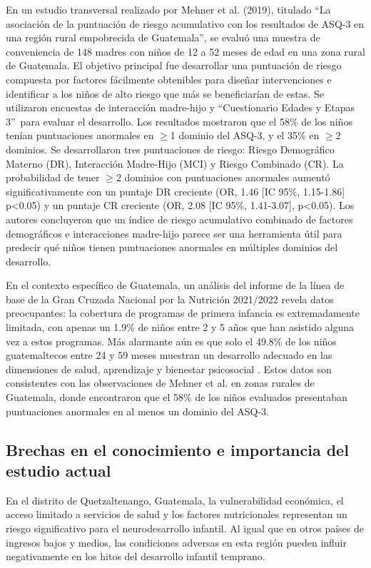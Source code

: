 \documentclass[11pt,letterpaper]{report}
\newcommand{\asq}{“Cuestionario Edades y Etapas 3”}
\begin{document}
En un estudio transversal realizado por Mehner et al. (2019), titulado
``La asociación de la puntuación de riesgo acumulativo con los resultados de
ASQ-3 en una región rural empobrecida de Guatemala'', se evaluó una muestra de
conveniencia de 148 madres con niños de 12 a 52 meses de edad en una zona rural
de Guatemala. El objetivo principal fue desarrollar una puntuación de riesgo
compuesta por factores fácilmente obtenibles para diseñar intervenciones e
identificar a los niños de alto riesgo que más se beneficiarían de estas. Se
utilizaron encuestas de interacción madre-hijo y \asq\ para evaluar el
desarrollo. Los resultados mostraron que el 58\% de los niños tenían
puntuaciones anormales en $\ge$1 dominio del ASQ-3, y el 35\% en $\ge$2
dominios. Se desarrollaron tres puntuaciones de riesgo: Riesgo Demográfico
Materno (DR), Interacción Madre-Hijo (MCI) y Riesgo Combinado (CR). La
probabilidad de tener $\ge$2 dominios con puntuaciones anormales aumentó
significativamente con un puntaje DR creciente (OR, 1.46 [IC 95\%, 1.15-1.86]
p<0.05) y un puntaje CR creciente (OR, 2.08 [IC 95\%, 1.41-3.07], p<0.05). Los
autores concluyeron que un índice de riesgo acumulativo combinado de factores
demográficos e interacciones madre-hijo parece ser una herramienta útil para
predecir qué niños tienen puntuaciones anormales en múltiples dominios del
desarrollo. \cite{CMehner2019}

En el contexto específico de Guatemala, un análisis del informe de la  línea de
base de la Gran Cruzada Nacional por la Nutrición 2021/2022 revela  datos
preocupantes: la cobertura de programas de primera infancia es extremadamente
limitada, con apenas un 1.9\% de niños entre 2 y 5 años que han asistido alguna
vez a estos programas. Más alarmante aún es que solo el 49.8\% de los niños
guatemaltecos entre 24 y 59 meses muestran un desarrollo adecuado  en las
dimensiones de salud, aprendizaje y bienestar psicosocial \cite{SESAN2022}.
Estos datos son consistentes con las observaciones de Mehner et al.
\cite{CMehner2019} en zonas rurales de Guatemala, donde encontraron que el 58\%
de los niños evaluados presentaban puntuaciones anormales en al menos un
dominio del ASQ-3.

\subsection{Brechas en el conocimiento e importancia del estudio actual}
En el distrito de Quetzaltenango, Guatemala, la vulnerabilidad económica, el
acceso limitado a servicios de salud y los factores nutricionales representan
un riesgo significativo para el neurodesarrollo infantil. Al igual que en otros
países de ingresos bajos y medios, las condiciones adversas en esta región
pueden influir negativamente en los hitos del desarrollo infantil temprano.
\end{document}
